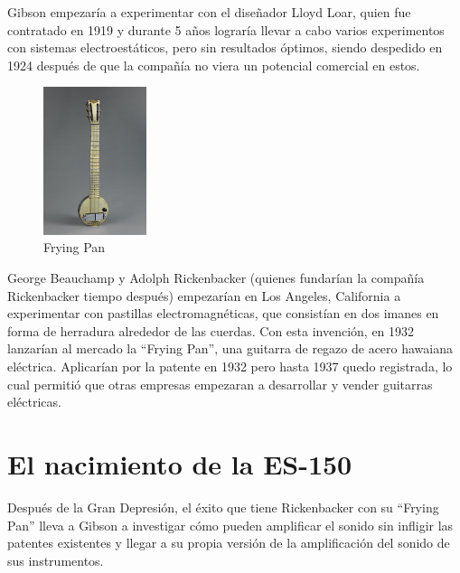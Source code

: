 \documentclass{article}
\begin{document}
Gibson empezaría a experimentar con el diseñador Lloyd Loar, quien fue contratado en 1919 y durante 5 años lograría llevar a cabo varios experimentos con sistemas electroestáticos, pero sin resultados óptimos, siendo despedido en 1924 después de que la compañía no viera un potencial comercial en estos. \\

\begingroup
\setlength{\intextsep}{0pt}%
\setlength{\columnsep}{0pt}%

\begin{figure}
    \centering
    \includegraphics[width=0.27\textwidth]{images/frying_pan.jpg}
    \vspace{-5pt}
    \caption{Frying Pan}
\end{figure}

George Beauchamp y Adolph Rickenbacker (quienes fundarían la compañía Rickenbacker tiempo después) empezarían en Los Angeles, California a experimentar con pastillas electromagnéticas, que consistían en dos imanes en forma de herradura alrededor de las cuerdas. Con esta invención, en 1932 lanzarían al mercado la “Frying Pan”, una guitarra de regazo de acero hawaiana eléctrica. Aplicarían por la patente en 1932 pero hasta 1937 quedo registrada, lo cual permitió que otras empresas empezaran a desarrollar y vender guitarras eléctricas.

\endgroup

\section{El nacimiento de la ES-150}

Después de la Gran Depresión, el éxito que tiene Rickenbacker con su “Frying Pan” lleva a Gibson a investigar cómo pueden amplificar el sonido sin infligir las patentes existentes y llegar a su propia versión de la amplificación del sonido de sus instrumentos.\\

\begingroup
\setlength{\intextsep}{0pt}%
\setlength{\columnsep}{0pt}%
\end{document}
